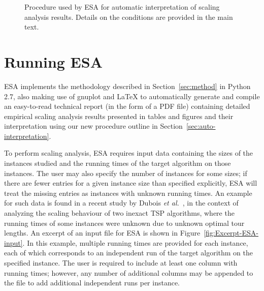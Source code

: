 \documentclass[aic]{iosart2x}
\newcommand{\etal}{\emph{et al.}}
\begin{document}
\begin{figure}[t]
\begin{centering}
{{\begin{tikzpicture}[node distance = 7em, auto]
\end{tikzpicture}}
}

\par\end{centering}{\small \par}

\caption{Procedure used by ESA for automatic interpretation of scaling analysis results. Details on the conditions are provided in the main text.}\label{fig:ESA-auto-interpretation}
\end{figure}


\section{Running ESA}
\label{sec:Implementation and Use}

ESA implements the methodology described in Section~\ref{sec:method} in Python 2.7, also making use of gnuplot and \LaTeX{} to automatically generate and compile an easy-to-read technical report (in the form of a PDF file) containing detailed empirical scaling analysis results presented in tables and figures and their interpretation using our new procedure outline in Section~\ref{sec:auto-interpretation}.

\label{sec:ESA-Input}

To perform scaling analysis, ESA requires input data containing the sizes of the instances studied and the running times of the target algorithm on those instances. 
The user may also specify the number of instances for some sizes; if there are fewer entries for a given instance size than specified explicitly, ESA will treat the missing entries as instances with unknown running times. 
An example for such data is found in a recent study by Dubois \etal~\cite{DubEtAl15}, in the context of analyzing the scaling behaviour of two inexact TSP algorithms, where the running times of some instances were unknown due to unknown optimal tour lengths. 
An excerpt of an input file for ESA is shown in Figure~\ref{fig:Excerpt-ESA-input}. 
In this example, multiple running times are provided for each instance, each of which corresponds to an independent run of the target algorithm on the specified instance. The user is required to include at least one column with running times; however, any number of additional columns may be appended to the file to add additional independent runs per instance. 
\end{document}
